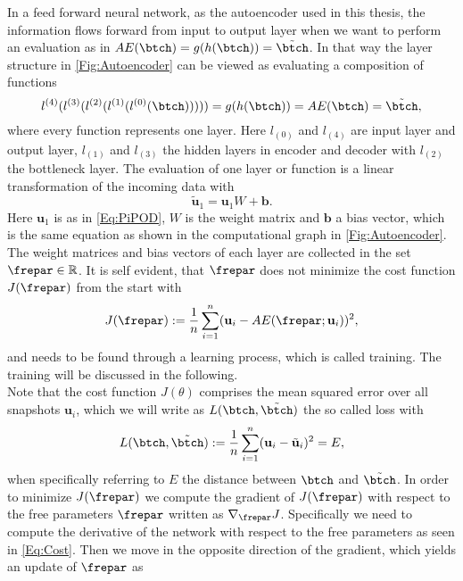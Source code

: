 In a feed forward neural network, as the autoencoder used in this thesis, the information flows forward from input to output layer when we want to perform an evaluation as in \(AE(\btch) = g(h(\btch)) =\tilde{\btch }\). In that way the layer structure in \cref{Fig:Autoencoder} can be viewed as evaluating a composition of functions
\begin{equation}
	l^{(4)}(l^{(3)}(l^{(2)}(l^{(1)}(l^{(0)}(\btch))))) = g(h(\btch)) = AE(\btch) = \tilde{\btch}\mathrm{,}
	\label{Eq:Composition}
\end{equation}
where every function represents one layer. Here \(l_{(0)}\) and \(l_{(4)}\) are input layer and output layer, \(l_{(1)}\) and \(l_{(3)}\) the hidden layers in encoder and decoder with \(l_{(2)}\) the bottleneck layer. The evaluation of one layer or function is a linear transformation of the incoming data with
\begin{equation}
\tilde{\mathbf{u}}_1 = \mathbf{u}_1W + \mathbf{b}\mathrm{.} \label{Eq:Linear Transformation}
\end{equation}
Here \(\mathbf{u}_1\) is as in \cref{Eq:PiPOD}, \(W\) is the weight matrix and \(\mathbf{b}\) a bias vector, which is the same equation as shown in the computational graph in \cref{Fig:Autoencoder}. The weight matrices and bias vectors of each layer are collected in the set \(\frepar \in \mathbb{R}\).  It is self evident, that \(\frepar\) does not minimize the cost function \(J(\frepar)\) from the start with
\begin{equation}
	J(\frepar) := \frac{1}{n}\sum_{i=1}^n (\mathbf{u}_i - AE(\frepar;\mathbf{u}_i))^2\mathrm{,}
	\label{Eq:Cost}
\end{equation}
and needs to be found through a learning process, which is called training. The training will be discussed in the following.\\
Note that the cost function \(J(\theta)\) comprises the mean squared error over all snapshots \(\mathbf{u}_i\), which we will write as \(L(\btch,\tilde{\btch})\) the so called loss with
\begin{equation}
	L(\btch,\tilde{\btch}) := \frac{1}{n}\sum_{i=1}^n(\mathbf{u}_i - \tilde{\mathbf{u}}_i)^2 = E \mathrm{,}
\end{equation}
when specifically referring to \(E\) the distance between \(\btch\) and $\tilde{\btch}$. In order to minimize \(J(\frepar)\) we compute the gradient of \(J(\frepar)\) with respect to the free parameters \(\frepar\) written as \(\nabla_{\frepar}J\). Specifically we need to compute the derivative of the network with respect to the free parameters as seen in \cref{Eq:Cost}. Then we move in the opposite direction of the gradient, which yields an update of \(\frepar\) as
